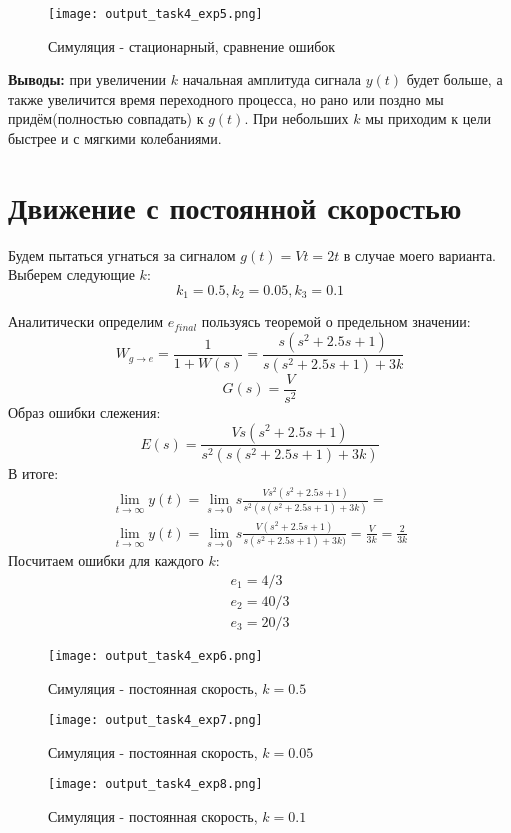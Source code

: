 \begin{figure}[ht]
  \centering
  \texttt{[image: output\_task4\_exp5.png]}
\caption{Симуляция - стационарный, сравнение ошибок}
\end{figure}

\newpage
\textbf{Выводы:} при увеличении $k$ начальная амплитуда сигнала $y(t)$ будет больше, а также увеличится время переходного процесса, но рано или поздно мы придём(полностью совпадать) к $g(t)$. 
При небольших $k$ мы приходим к цели быстрее и с мягкими колебаниями.

\section{Движение с постоянной скоростью}
Будем пытаться угнаться за сигналом $g(t) = Vt = 2t$ в случае моего варианта.
Выберем следующие $k$:
$$
k_1 = 0.5, k_2 = 0.05,  k_3 = 0.1
$$

Аналитически определим $e_{final}$ пользуясь теоремой о предельном значении:
$$
W_{g\to e} = \frac{1}{1+W(s)} = \frac{s(s^2 +2.5s + 1)}{s(s^2 + 2.5s + 1) + 3k}
$$
$$
G(s) = \frac{V}{s^2}
$$
Образ ошибки слежения:
$$
E(s) = \frac{Vs(s^2 +2.5s + 1)}{s^2(s(s^2 + 2.5s + 1) + 3k)}
$$
В итоге:
$$
\begin{aligned}
  \lim_{t\to\infty} y(t) = \lim_{s\to 0}s\frac{Vs^2(s^2 +2.5s + 1)}{s^2(s(s^2 + 2.5s + 1) + 3k)} =  \\
  \lim_{t\to\infty} y(t) = \lim_{s\to 0}s\frac{V(s^2 +2.5s + 1)}{s(s^2 + 2.5s + 1) + 3k)} =  \frac{V}{3k} =  \frac{2}{3k}
\end{aligned}
$$
Посчитаем ошибки для каждого $k$:
$$
\begin{aligned}
  e_1 = 4/3 \\
  e_2 = 40/3\\
  e_3 = 20/3
\end{aligned}
$$

\begin{figure}[ht]
  \centering
  \texttt{[image: output\_task4\_exp6.png]}
\caption{Симуляция - постоянная скорость, $k=0.5$}
\end{figure}

\newpage
\begin{figure}[ht]
  \centering
  \texttt{[image: output\_task4\_exp7.png]}
\caption{Симуляция - постоянная скорость, $k=0.05$}
\end{figure}

\begin{figure}[ht]
  \centering
  \texttt{[image: output\_task4\_exp8.png]}
\caption{Симуляция - постоянная скорость, $k=0.1$}
\end{figure}

